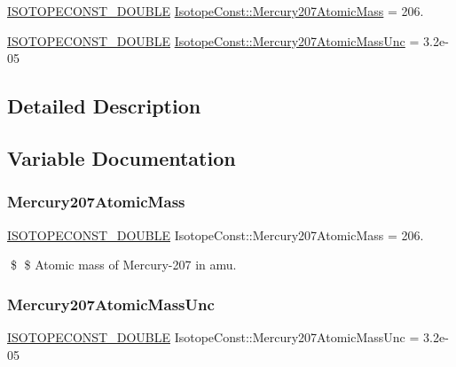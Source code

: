 \begin{DoxyCompactItemize}
\item 
\mbox{\hyperlink{group___isotope_const-_macros_ga8f45a7272ce02c0b4c65c44636ed719a}{I\+S\+O\+T\+O\+P\+E\+C\+O\+N\+S\+T\+\_\+\+D\+O\+U\+B\+LE}} \mbox{\hyperlink{group___isotope_const-_mercury-_hg207_gac5b80972854efa1ea0ed5d7fb101e9a9}{Isotope\+Const\+::\+Mercury207\+Atomic\+Mass}} = 206.
\item 
\mbox{\hyperlink{group___isotope_const-_macros_ga8f45a7272ce02c0b4c65c44636ed719a}{I\+S\+O\+T\+O\+P\+E\+C\+O\+N\+S\+T\+\_\+\+D\+O\+U\+B\+LE}} \mbox{\hyperlink{group___isotope_const-_mercury-_hg207_ga55c6ed3b17caa0bf7c40231447ae7462}{Isotope\+Const\+::\+Mercury207\+Atomic\+Mass\+Unc}} = 3.\+2e-\/05
\end{DoxyCompactItemize}


\subsection{Detailed Description}


\subsection{Variable Documentation}
\mbox{\label{group___isotope_const-_mercury-_hg207_gac5b80972854efa1ea0ed5d7fb101e9a9}} 
\subsubsection{\texorpdfstring{Mercury207\+Atomic\+Mass}{Mercury207AtomicMass}}
{\footnotesize\ttfamily \mbox{\hyperlink{group___isotope_const-_macros_ga8f45a7272ce02c0b4c65c44636ed719a}{I\+S\+O\+T\+O\+P\+E\+C\+O\+N\+S\+T\+\_\+\+D\+O\+U\+B\+LE}} Isotope\+Const\+::\+Mercury207\+Atomic\+Mass = 206.}

\$ \$ Atomic mass of Mercury-\/207 in amu. \mbox{\label{group___isotope_const-_mercury-_hg207_ga55c6ed3b17caa0bf7c40231447ae7462}} 
\subsubsection{\texorpdfstring{Mercury207\+Atomic\+Mass\+Unc}{Mercury207AtomicMassUnc}}
{\footnotesize\ttfamily \mbox{\hyperlink{group___isotope_const-_macros_ga8f45a7272ce02c0b4c65c44636ed719a}{I\+S\+O\+T\+O\+P\+E\+C\+O\+N\+S\+T\+\_\+\+D\+O\+U\+B\+LE}} Isotope\+Const\+::\+Mercury207\+Atomic\+Mass\+Unc = 3.\+2e-\/05}

